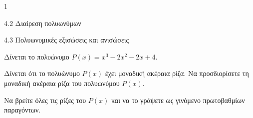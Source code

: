 \begin{ylh}{1}
\item 4.2 Διαίρεση πολυωνύμων
\item 4.3 Πολυωνυμικές εξισώσεις και ανισώσεις
\end{ylh}
Δίνεται το πολυώνυμο $P(x) = x^{3} - 2x^{2} - 2x + 4.$
\begin{alist}
\item Δίνεται ότι το πολυώνυμο $P(x)$ έχει μοναδική ακέραια ρίζα. Να προσδιορίσετε τη μοναδική ακέραια ρίζα του πολυωνύμου $P(x).$
\item Να βρείτε όλες τις ρίζες του $P(x)$ και να το γράψετε ως γινόμενο πρωτοβαθμίων παραγόντων.
\end{alist}

